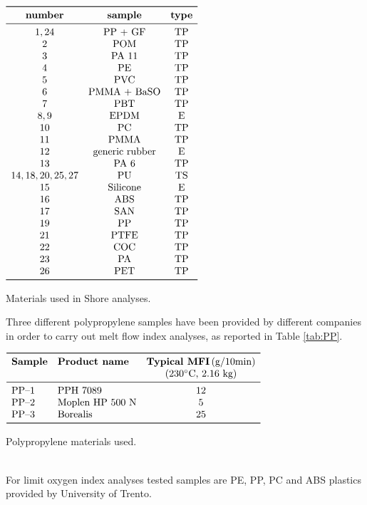 \documentclass[a4paper, 11pt]{article}
\begin{document}
\begin{table}[htp]
	\centering
	$
	\begin{array}{ccc}
	\toprule
	\textbf{number} & \textbf{sample} & \textbf{type} \\
	\midrule
	1,24 & \text{PP + GF} & \text{TP}\\
	2 & \text{POM} & \text{TP}\\
	3 & \text{PA 11} & \text{TP}\\
	4 & \text{PE} & \text{TP}\\
	5 & \text{PVC} & \text{TP}\\
	6 & \text{PMMA + BaSO} & \text{TP}\\
	7 & \text{PBT} & \text{TP}\\
	8,9 & \text{EPDM} & \text{E}\\
    10 & \text{PC} & \text{TP}\\
	11 & \text{PMMA} & \text{TP}\\
	12 & \text{generic rubber} & \text{E}\\
	13 & \text{PA 6} & \text{TP}\\
	14,18,20,25,27 & \text{PU} & \text{TS}\\
	15 & \text{Silicone} & \text{E}\\
	16 & \text{ABS} & \text{TP}\\
	17 & \text{SAN} & \text{TP}\\
	19 & \text{PP} & \text{TP}\\
	21 & \text{PTFE} & \text{TP}\\
	22 & \text{COC} & \text{TP}\\
	23 & \text{PA} & \text{TP}\\
	26 & \text{PET} & \text{TP}\\
	\bottomrule
	\end{array}
	$
	\caption{Materials used in Shore analyses.}
	\label{tab:polymers}
\end{table}
Three different polypropylene samples have been provided by different companies in order to carry out melt flow index analyses, as reported in Table \ref{tab:PP}. 
\begin{table}[htp]
	\centering
	$
	\begin{array}{llc}
	\toprule
	\textbf{Sample} & \textbf{Product name} & \textbf{Typical MFI} \, \text{(g/10min)}  \\
	& & (230^\circ \text{C, 2.16 kg}) \\
	\midrule
	\text{PP–1} & \text{PPH 7089} & 12\\
	\text{PP–2} & \text{Moplen HP 500 N} & 5\\
	\text{PP–3} & \text{Borealis} & 25\\
	\bottomrule
	\end{array}
	$
	\caption{Polypropylene materials used.}
	\label{tab:PP}
\end{table}
\\
For limit oxygen index analyses tested samples are PE, PP, PC and ABS plastics provided by University of Trento. 
\end{document}
